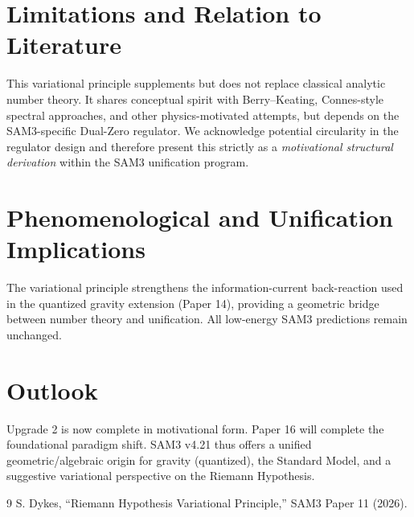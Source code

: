 \documentclass[11pt,a4paper]{article}
\begin{document}
\section{Limitations and Relation to Literature}
This variational principle supplements but does not replace classical analytic number theory. It shares conceptual spirit with Berry–Keating, Connes-style spectral approaches, and other physics-motivated attempts, but depends on the SAM3-specific Dual-Zero regulator. We acknowledge potential circularity in the regulator design and therefore present this strictly as a \emph{motivational structural derivation} within the SAM3 unification program.

\section{Phenomenological and Unification Implications}
The variational principle strengthens the information-current back-reaction used in the quantized gravity extension (Paper 14), providing a geometric bridge between number theory and unification. All low-energy SAM3 predictions remain unchanged.

\section{Outlook}
Upgrade 2 is now complete in motivational form. Paper 16 will complete the foundational paradigm shift. SAM3 v4.21 thus offers a unified geometric/algebraic origin for gravity (quantized), the Standard Model, and a suggestive variational perspective on the Riemann Hypothesis.


\begin{thebibliography}{9}
 S. Dykes, ``Riemann Hypothesis Variational Principle,'' SAM3 Paper 11 (2026).
\end{thebibliography}
\end{document}
